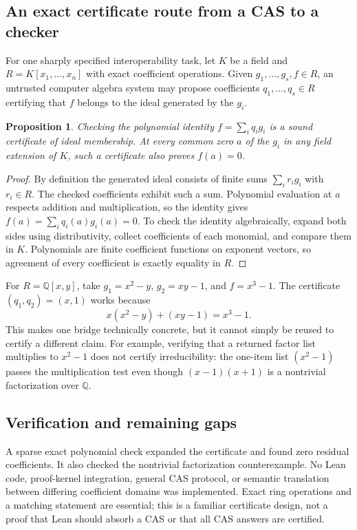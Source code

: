 \documentclass[11pt]{article}
\newtheorem{proposition}{Proposition}
\begin{document}
\subsection{An exact certificate route from a CAS to a checker}
For one sharply specified interoperability task, let $K$ be a field and $R=K[x_1,\ldots,x_n]$ with exact coefficient operations. Given $g_1,\ldots,g_s,f\in R$, an untrusted computer algebra system may propose coefficients $q_1,\ldots,q_s\in R$ certifying that $f$ belongs to the ideal generated by the $g_i$.
\begin{proposition}
Checking the polynomial identity $f=\sum_iq_ig_i$ is a sound certificate of ideal membership. At every common zero $a$ of the $g_i$ in any field extension of $K$, such a certificate also proves $f(a)=0$.
\end{proposition}
\begin{proof}
By definition the generated ideal consists of finite sums $\sum_i r_i g_i$ with $r_i\in R$. The checked coefficients exhibit such a sum. Polynomial evaluation at $a$ respects addition and multiplication, so the identity gives $f(a)=\sum_i q_i(a)g_i(a)=0$. To check the identity algebraically, expand both sides using distributivity, collect coefficients of each monomial, and compare them in $K$. Polynomials are finite coefficient functions on exponent vectors, so agreement of every coefficient is exactly equality in $R$.
\end{proof}
For $R=\mathbb Q[x,y]$, take $g_1=x^2-y$, $g_2=xy-1$, and $f=x^3-1$. The certificate $(q_1,q_2)=(x,1)$ works because
\[
x(x^2-y)+(xy-1)=x^3-1.
\]
This makes one bridge technically concrete, but it cannot simply be reused to certify a different claim. For example, verifying that a returned factor list multiplies to $x^2-1$ does not certify irreducibility: the one-item list $(x^2-1)$ passes the multiplication test even though $(x-1)(x+1)$ is a nontrivial factorization over $\mathbb Q$.
\subsection{Verification and remaining gaps}
A sparse exact polynomial check expanded the certificate and found zero residual coefficients. It also checked the nontrivial factorization counterexample. No Lean code, proof-kernel integration, general CAS protocol, or semantic translation between differing coefficient domains was implemented. Exact ring operations and a matching statement are essential; this is a familiar certificate design, not a proof that Lean should absorb a CAS or that all CAS answers are certified.
\end{document}
